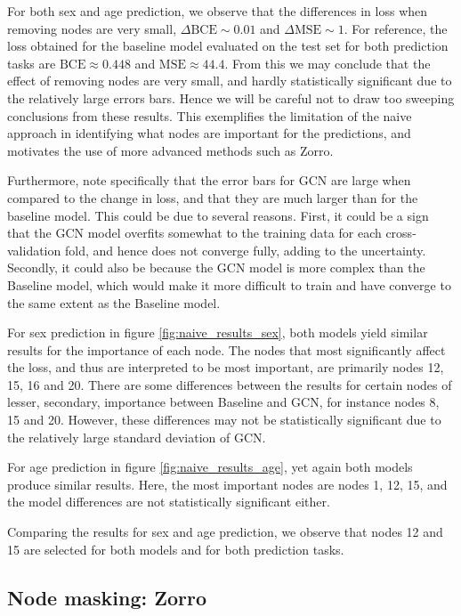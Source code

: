 For both sex and age prediction, we observe that the differences in loss when removing nodes are very small, $\Delta\text{BCE} \sim 0.01$ and $\Delta\text{MSE} \sim 1$. For reference, the loss obtained for the baseline model evaluated on the test set for both prediction tasks are $\text{BCE} \approx 0.448$ and $\text{MSE} \approx 44.4$. From this we may conclude that the effect of removing nodes are very small, and hardly statistically significant due to the relatively large errors bars. Hence we will be careful not to draw too sweeping conclusions from these results. This exemplifies the limitation of the naive approach in identifying what nodes are important for the predictions, and motivates the use of more advanced methods such as Zorro.

Furthermore, note specifically that the error bars for GCN are large when compared to the change in loss, and that they are much larger than for the baseline model. This could be due to several reasons. First, it could be a sign that the GCN model overfits somewhat to the training data for each cross-validation fold, and hence does not converge fully, adding to the uncertainty. Secondly, it could also be because the GCN model is more complex than the Baseline model, which would make it more difficult to train and have converge to the same extent as the Baseline model.

For sex prediction in figure \ref{fig:naive_results_sex}, both models yield similar results for the importance of each node. The nodes that most significantly affect the loss, and thus are interpreted to be most important, are primarily nodes 12, 15, 16 and 20. There are some differences between the results for certain nodes of lesser, secondary, importance between Baseline and GCN, for instance nodes 8, 15 and 20. However, these differences may not be statistically significant due to the relatively large standard deviation of GCN.

For age prediction in figure \ref{fig:naive_results_age}, yet again both models produce similar results. Here, the most important nodes are nodes 1, 12, 15, and the model differences are not statistically significant either.

Comparing the results for sex and age prediction, we observe that nodes 12 and 15 are selected for both models and for both prediction tasks. 
 
\subsection{Node masking: Zorro}

